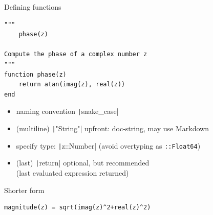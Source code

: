 \documentclass[aspectratio=169, 11pt, handout]{beamer}
\begin{document}
    \begin{frame}[fragile]{Defining functions}
        \begin{verbatim}
"""
    phase(z)

Compute the phase of a complex number z
"""
function phase(z)
    return atan(imag(z), real(z))
end
        \end{verbatim}
        \begin{itemize}[<+->]
            \item \alert{naming convention} \texttt|snake_case|
            \item (multiline) \texttt|"String"| upfront: doc-string, may use  Markdown
            \item specify type: \texttt|z::Number| (\alert{avoid} overtyping as \texttt{::Float64})
            \item (last) \texttt|return| optional, but recommended\\
            \hfill(last evaluated expression returned)
        \end{itemize}
    \pause
    Shorter form
    \begin{verbatim}
magnitude(z) = sqrt(imag(z)^2+real(z)^2)
    \end{verbatim}
    \end{frame}
\end{document}
